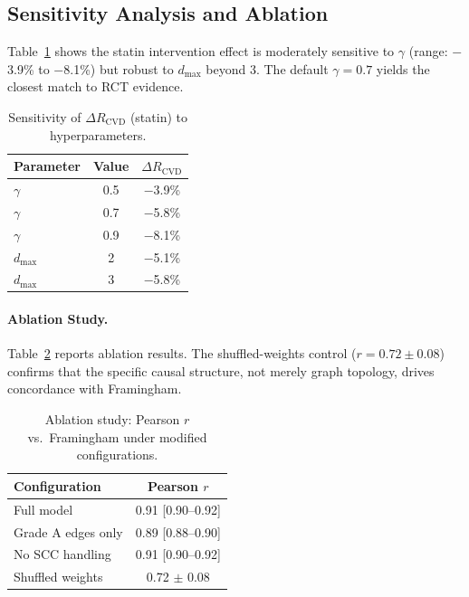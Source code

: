 \documentclass[runningheads]{llncs}
\begin{document}
\subsection{Sensitivity Analysis and Ablation}\label{sec:sensitivity}

Table~\ref{tab:sensitivity} shows the statin intervention effect is
moderately sensitive to $\gamma$ (range: $-$3.9\% to $-$8.1\%) but
robust to $d_{\max}$ beyond 3.  The default $\gamma = 0.7$ yields
the closest match to RCT evidence.

\begin{table}[t]
\centering
\caption{Sensitivity of $\Delta R_{\text{CVD}}$ (statin) to
hyperparameters.}\label{tab:sensitivity}
\small
\begin{tabular}{@{}lcc@{}}
\toprule
\textbf{Parameter} & \textbf{Value} & \textbf{$\Delta R_{\text{CVD}}$} \\
\midrule
$\gamma$ & 0.5 & $-$3.9\% \\
$\gamma$ & 0.7 & $-$5.8\% \\
$\gamma$ & 0.9 & $-$8.1\% \\
$d_{\max}$ & 2 & $-$5.1\% \\
$d_{\max}$ & 3 & $-$5.8\% \\
\bottomrule
\end{tabular}
\end{table}

\paragraph{Ablation Study.}\label{sec:ablation}
Table~\ref{tab:ablation} reports ablation results.  The
shuffled-weights control ($r = 0.72 \pm 0.08$) confirms that the
specific causal structure, not merely graph topology, drives
concordance with Framingham.

\begin{table}[t]
\centering
\caption{Ablation study: Pearson $r$ vs.\ Framingham under
modified configurations.}\label{tab:ablation}
\small
\begin{tabular}{@{}lc@{}}
\toprule
\textbf{Configuration} & \textbf{Pearson $r$} \\
\midrule
Full model           & 0.91 [0.90--0.92] \\
Grade A edges only   & 0.89 [0.88--0.90] \\
No SCC handling      & 0.91 [0.90--0.92] \\
Shuffled weights     & 0.72 $\pm$ 0.08 \\
\bottomrule
\end{tabular}
\end{table}
\end{document}

